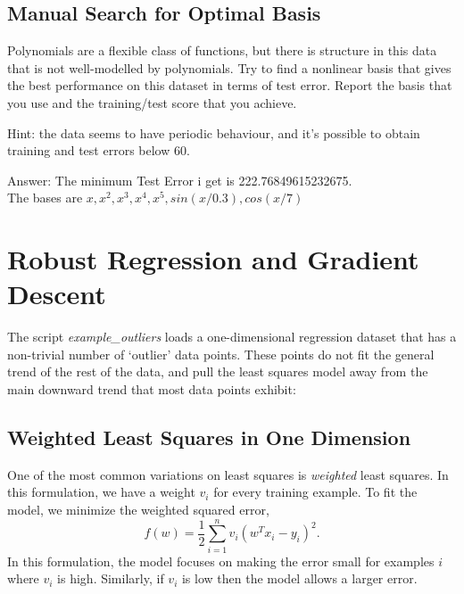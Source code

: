 \documentclass{article}
\def\ans#1{\par\gre{Answer: #1}}
\def\blu#1{{\color{blu}#1}}
\def\gre#1{{\color{gre}#1}}
\newcommand{\centerfig}[2]{\begin{center}\texttt{[image: a3f/\#2]}\end{center}}
\begin{document}
\subsection{Manual Search for Optimal Basis}

Polynomials are a flexible class of functions, but there is structure in this data that is not well-modelled by polynomials. Try to find a nonlinear basis that gives the best performance on this dataset in terms of test error. \blu{Report the basis that you use and the training/test score that you achieve}.

Hint: the data seems to have periodic behaviour, and it's possible to obtain training and test errors below 60.
\ans{The minimum Test Error i get is 222.76849615232675. \\
The bases are $x, x^2, x^3, x^4, x^5, sin(x/0.3), cos(x/7)$ }
\section{Robust Regression and Gradient Descent}

The script \emph{example\_outliers} loads a one-dimensional regression dataset that has a non-trivial number of `outlier' data points. These points do not fit the general trend of the rest of the data, and pull the least squares model away from the main downward trend that most data points exhibit:




\subsection{Weighted Least Squares in One Dimension}

One of the most common variations on least squares is \emph{weighted} least squares. In this formulation, we have a weight $v_i$ for every training example. To fit the model, we minimize the weighted squared error,
\[
f(w) =  \frac{1}{2}\sum_{i=1}^n v_i(w^Tx_i - y_i)^2.
\]
In this formulation, the model focuses on making the error small for examples $i$ where $v_i$ is high. Similarly, if $v_i$ is low then the model allows a larger error.
\end{document}
